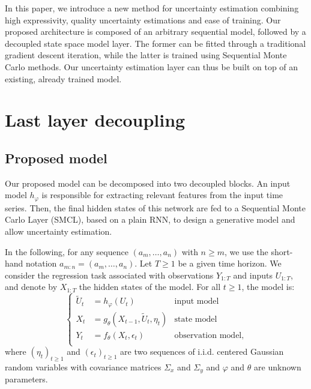 \documentclass{article}
\begin{document}
In this paper, we introduce a new method for uncertainty estimation combining high expressivity, quality uncertainty estimations and ease of training.
Our proposed architecture is composed of an arbitrary sequential model, followed by a decoupled state space model layer.
The former can be fitted through a traditional gradient descent iteration, while the latter is trained using Sequential Monte Carlo methods.
Our uncertainty estimation layer can thus be built on top of an existing, already trained model.

\section{Last layer decoupling}
\label{sec:decoupling}

\subsection{Proposed model}%
\label{sub:proposed_architecture}

Our proposed model can be decomposed into two decoupled blocks.
An input model $h_\varphi$ is responsible for extracting relevant features from the input time series. Then, the final hidden states of this network are fed to a Sequential Monte Carlo Layer (SMCL), based on a plain RNN, to design a generative model and allow uncertainty estimation.

In the following, for any sequence $(a_m,\ldots, a_n)$ with $n\geq m$, we use the short-hand notation $a_{m:n} = (a_m,\ldots, a_n)$. Let $T\ge 1$ be a given time horizon. We consider the regression task associated with observations $Y_{1:T}$ and inputs $U_{1:T}$, and denote by $X_{1:T}$ the hidden states of the model. For all $t\geq 1$, the model is:
\begin{equation*}
	\left\{
	\begin{aligned}
		\widetilde U_t & = h_\varphi(U_t)                        & \text{input model}       \\
		X_t        & = g_\theta(X_{t-1}, \widetilde U_t, \eta_t) & \text{state model}       \\
		Y_t        & = f_\theta(X_t, \epsilon_t)             & \text{observation model,} \\
	\end{aligned}
	\right.
\end{equation*}
where $(\eta_t)_{t\geq 1}$ and $(\epsilon_t)_{t\geq 1}$ are two sequences of i.i.d. centered Gaussian random variables with covariance matrices $\Sigma_x$ and $\Sigma_y$ and $\varphi$ and $\theta$ are unknown parameters.
\end{document}
